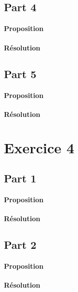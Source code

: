 \documentclass{article}
\begin{document}
\subsection{Part 4}
\paragraph{Proposition}

\paragraph{Résolution}


\subsection{Part 5}
\paragraph{Proposition}

\paragraph{Résolution}



\section{Exercice 4}
\subsection{Part 1}
\paragraph{Proposition}

\paragraph{Résolution}


\subsection{Part 2}
\paragraph{Proposition}

\paragraph{Résolution}
\end{document}
